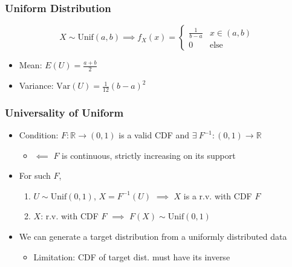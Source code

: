 \subsubsection*{Uniform Distribution}
\begin{equation}
    X\sim\text{Unif}(a,b)\implies f_X(x)=\begin{cases}
        \frac{1}{b-a} & x\in(a,b)\\
        0 & \text{else}
    \end{cases}
\end{equation}
\begin{itemize}
    \item Mean: $E(U)=\frac{a+b}{2}$
    \item Variance: $\text{Var}(U)=\frac{1}{12}(b-a)^2$
\end{itemize}

\subsubsection*{Universality of Uniform}
\begin{itemize}
    \item Condition: $F:\mathbb{R}\to(0,1)$ is a valid CDF and $\exists~F^{-1}:(0,1)\to\mathbb{R}$
    \begin{itemize}
        \item $\impliedby$ $F$ is continuous, strictly increasing on its support
    \end{itemize}
    \item For such $F$,
    \begin{enumerate}
        \item $U\sim\text{Unif}(0,1)$, $X=F^{-1}(U)$ $\implies$ $X$ is a r.v. with CDF $F$
        \item $X$: r.v. with CDF $F$ $\implies$ $F(X)\sim\text{Unif}(0,1)$
    \end{enumerate}
    \item We can generate a target distribution from a uniformly distributed data
    \begin{itemize}
        \item Limitation: CDF of target dist. must have its inverse
    \end{itemize}
\end{itemize}

